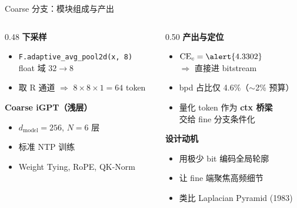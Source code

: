 \documentclass[10pt,aspectratio=169]{beamer}
\begin{document}
\begin{frame}{Coarse 分支：模块组成与产出}
\begin{columns}[T]
\begin{column}{0.48\textwidth}
\textbf{下采样}
\begin{itemize}
  \item \texttt{F.adaptive\_avg\_pool2d(x, 8)} \\
        float 域 $32 \to 8$
  \item 取 R 通道 $\Rightarrow$ $8{\times}8{\times}1 = 64$ token
\end{itemize}

\bigskip
\textbf{Coarse iGPT（浅层）}
\begin{itemize}
  \item $d_{\text{model}} = 256$, $N = 6$ 层
  \item 标准 NTP 训练
  \item Weight Tying, RoPE, QK-Norm
\end{itemize}
\end{column}
\begin{column}{0.50\textwidth}
\textbf{产出与定位}
\begin{itemize}
  \item $\mathrm{CE}_c = \alert{4.3302}$ \\
        $\Rightarrow$ 直接进 bitstream
  \item bpd 占比仅 \alert{4.6\%}（$\sim$2\% 预算）
  \item 量化 token 作为 \textbf{ctx 桥梁} \\
        交给 fine 分支条件化
\end{itemize}

\bigskip
\textbf{设计动机}
\begin{itemize}
  \item 用极少 bit 编码全局轮廓
  \item 让 fine 端聚焦高频细节
  \item 类比 Laplacian Pyramid (1983)
\end{itemize}
\end{column}
\end{columns}
\end{frame}
\end{document}
